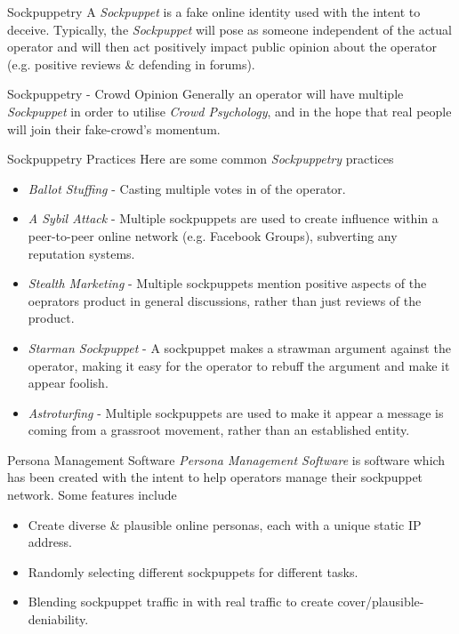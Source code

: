 \documentclass[11pt,a4paper]{article}
\begin{document}
  \begin{definition}{Sockpuppetry}
    A \textit{Sockpuppet} is a fake online identity used with the intent to deceive. Typically, the \textit{Sockpuppet} will pose as someone independent of the actual operator and will then act positively impact public opinion about the operator (e.g. positive reviews \& defending in forums).
  \end{definition}

  \begin{remark}{Sockpuppetry - Crowd Opinion}
    Generally an operator will have multiple \textit{Sockpuppet} in order to utilise \textit{Crowd Psychology}, and in the hope that real people will join their fake-crowd's momentum.
  \end{remark}

  \begin{proposition}{Sockpuppetry Practices}
    Here are some common \textit{Sockpuppetry} practices
    \begin{itemize}
      \item \textit{Ballot Stuffing} - Casting multiple votes in of the operator.
      \item \textit{A Sybil Attack} - Multiple sockpuppets are used to create influence within a peer-to-peer online network (e.g. Facebook Groups), subverting any reputation systems.
      \item \textit{Stealth Marketing} - Multiple sockpuppets mention positive aspects of the oeprators product in general discussions, rather than just reviews of the product.
      \item \textit{Starman Sockpuppet} - A sockpuppet makes a strawman argument against the operator, making it easy for the operator to rebuff the argument and make it appear foolish.
      \item \textit{Astroturfing} - Multiple sockpuppets are used to make it appear a message is coming from a grassroot movement, rather than an established entity.
    \end{itemize}
  \end{proposition}

  \begin{definition}{Persona Management Software}
    \textit{Persona Management Software} is software which has been created with the intent to help operators manage their sockpuppet network. Some features include
    \begin{itemize}
      \item Create diverse \& plausible online personas, each with a unique static IP address.
      \item Randomly selecting different sockpuppets for different tasks.
      \item Blending sockpuppet traffic in with real traffic to create cover/plausible-deniability.
    \end{itemize}
  \end{definition}
\end{document}
